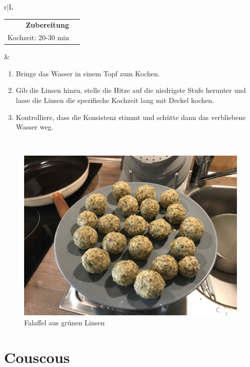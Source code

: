 \documentclass[a4paper, 12pt]{scrbook} 								%
\numberwithin{equation}{section} 									%
\begin{document}
\begin{tabularx}{\textwidth}{r|L}
		\begin{tabular}[t]{rr}
			\textbf{Zubereitung}	\\
			Kochzeit: 20-30 min\\
		\end{tabular}			&	\begin{enumerate}[nosep]
										\item Bringe das Wasser in einem Topf zum Kochen.
										\item Gib die Linsen hinzu, stelle die Hitze auf die niedrigste Stufe herunter und lasse die Linsen die spezifische Kochzeit lang mit Deckel kochen.
										\item Kontrolliere, dass die Konsistenz stimmt und schütte dann das verbliebene Wasser weg.
									\end{enumerate}	\\
	\end{tabularx}

	\begin{figure}
		\centering
		\includegraphics[width = \textwidth]{media/Falaffel.JPG}
		\caption{Falaffel aus grünen Linsen}
	\end{figure}
	\newpage


	\section{Couscous}
\end{document}
